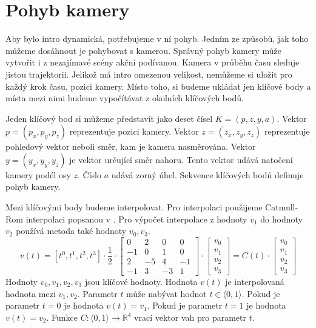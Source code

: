 
\section{Pohyb kamery}

Aby bylo intro dynamická, potřebujeme v ní pohyb.
Jedním ze způsobů, jak toho můžeme dosáhnout je pohybovat s kamerou.
Správný pohyb kamery může vytvořit i z nezajímavé scény akční podívanou.
Kamera v průběhu času sleduje jistou trajektorii.
Jelikož má intro omezenou velikost, nemůžeme si uložit pro každý krok času, pozici kamery.
Místo toho, si budeme ukládat jen klíčové body a místa mezi nimi budeme vypočítávat z okolních klíčových bodů.

Jeden klíčový bod si můžeme představit jako deset čísel $K=(p,z,y,a)$.
Vektor $p=(p_x,p_y,p_z)$ reprezentuje pozici kamery.
Vektor $z=(z_x,z_y,z_z)$ reprezentuje pohledový vektor neboli směr, kam je kamera nasměrována.
Vektor $y=(y_x,y_y,y_z)$ je vektor určující směr nahoru.
Tento vektor udává natočení kamery podél osy $z$.
Číslo $a$ udává zorný úhel.
Sekvence klíčových bodů definuje pohyb kamery.

Mezi klíčovými body budeme interpolovat.
Pro interpolaci použijeme Catmull-Rom interpolaci popsanou v \cite{CATMULLROM}.
Pro výpočet interpolace z hodnoty $v_1$ do hodnoty $v_2$ používá metoda také hodnoty $v_0,v_3$.
\begin{equation}
\label{eq:catmull0}
v(t)=[t^0,t^1,t^2,t^3]\cdot
\frac{1}{2}\cdot
\left[
\begin{array}{cccc}
 0 &  2 &  0 &  0 \\
-1 &  0 &  1 &  0 \\
 2 & -5 &  4 & -1 \\
-1 &  3 & -3 &  1
\end{array}
\right]
\cdot
\left[
\begin{array}{c}
v_{0} \\
v_{1} \\
v_{2} \\
v_{3} 
\end{array}
\right]
=
C(t) \cdot 
\left[
\begin{array}{c}
v_{0} \\
v_{1} \\
v_{2} \\
v_{3} 
\end{array}
\right]
\end{equation}
Hodnoty $v_0,v_1,v_2,v_3$ jsou klíčové hodnoty.
Hodnota $v(t)$ je interpolovaná hodnota mezi $v_1,v_2$.
Parametr $t$ může nabývat hodnot $t \in \langle 0,1 \rangle$.
Pokud je parametr $t=0$ je hodnota $v(t)=v_1$.
Pokud je parametr $t=1$ je hodnota $v(t)=v_2$.
Funkce $C: \langle 0,1 \rangle \to \mathbb{R}^4$ vrací vektor vah pro parametr $t$.

